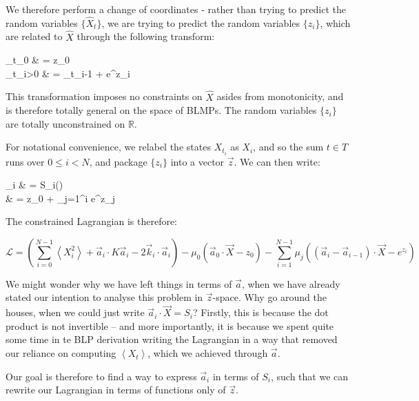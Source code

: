 \documentclass{article}
\def\llangle{\left\langle}
\def\rrangle{\right\rangle}
\newcommand\E[1]{\llangle #1 \rrangle}
\begin{document}
		We therefore perform a change of coordinates - rather than trying to predict the random variables $\{\hat{X}_t\}$, we are trying to predict the random variables $\{z_i\}$, which are related to $\hat{X}$ through the following transform:
		\begin{spalign}
			_{t_0} & = z_0
			\\
			_{t_{i>0}} & = _{t_{i-1}} + e^{z_i}
		\end{spalign}
		This transformation imposes no constraints on $\hat{X}$ asides from monotonicity, and is therefore totally general on the space of BLMPs. The random variables $\{z_i\}$ are totally unconstrained on $\mathbb{R}$.

		For notational convenience, we relabel the states $X_{t_i}$ as $X_i$, and so the sum $t \in T$ runs over $0 \leq i < N$, and package $\{z_i\}$ into a vector $\vec{z}$. We can then write:
		\begin{spalign}
			_i & = S_i(\vec{z})
			\\
			&  = z_0 + \sum_{j=1}^i e^{z_j}
		\end{spalign}
		
		The constrained Lagrangian is therefore:

		\begin{equation}
			\mathcal{L} = \left(\sum_{i  = 0}^{N-1} \E{X_i^2} + \vec{a}_i \cdot K \vec{a}_i - 2 \vec{k}_i \cdot \vec{a}_i\right) - \mu_0 \left( \vec{a}_0\cdot\vec{X} - z_0\right) - \sum_{i = 1}^{N-1} \mu_j \left(\left(\vec{a}_i - \vec{a}_{i-1}\right)\cdot \vec{X} - e^{z_i}\right)
		\end{equation}

		We might wonder why we have left things in terms of $\vec{a}$, when we have already stated our intention to analyse this problem in $$-space. Why go around the houses, when we could just write $\vec{a}_i \cdot \vec{X} = S_i$? Firstly, this is because the dot product is not invertible -- and more importantly, it is because we spent quite some time in te BLP derivation writing the Lagrangian in a way that removed our reliance on computing $\E{X_t}$, which we achieved through $\vec{a}$. 

		Our goal is therefore to find a way to express $\vec{a}_i$ in terms of $S_i$, such that we can rewrite our Lagrangian in terms of functions only of $\vec{z}$.
		\def\ai{\vec{a}_i}
		\def\vi{\vec{v}_i}
		\def\wi{\vec{w}}
		
\end{document}
